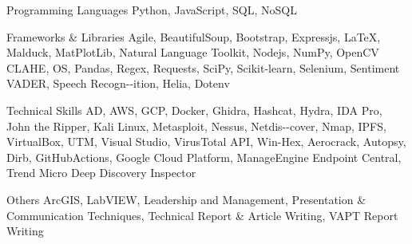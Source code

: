 \vspace{-5.0mm}         
\begin{cvskills}

\cvskill
   {Programming Languages} %
   {Python, JavaScript, SQL, NoSQL} %

\cvskill
    {Frameworks \& Libraries} %
    {Agile, BeautifulSoup, Bootstrap, Expressjs, \textrm{\LaTeX}, Malduck, MatPlotLib, Natural Language Toolkit, Nodejs, NumPy, \newline OpenCV CLAHE, OS, Pandas, Regex, Requests, SciPy, Scikit-learn, Selenium, Sentiment VADER, Speech Recogn-\newline -ition, Helia, Dotenv} %

\cvskill
    {Technical Skills} %
    {AD, AWS, GCP, Docker, Ghidra, Hashcat, Hydra, IDA Pro, John the Ripper, Kali Linux, Metasploit, Nessus, Netdis-\newline -cover, Nmap, IPFS, VirtualBox, UTM, Visual Studio, VirusTotal API, Win-Hex, Aerocrack, Autopsy, Dirb, GitHub\newline Actions, Google Cloud Platform, ManageEngine Endpoint Central, Trend Micro Deep Discovery Inspector} %

\cvskill
    {Others} %
    {ArcGIS, LabVIEW, Leadership and Management, Presentation \& Communication Techniques, Technical Report \& \newline Article Writing, VAPT Report Writing} %

\vspace{-10.0mm}  
\end{cvskills}
